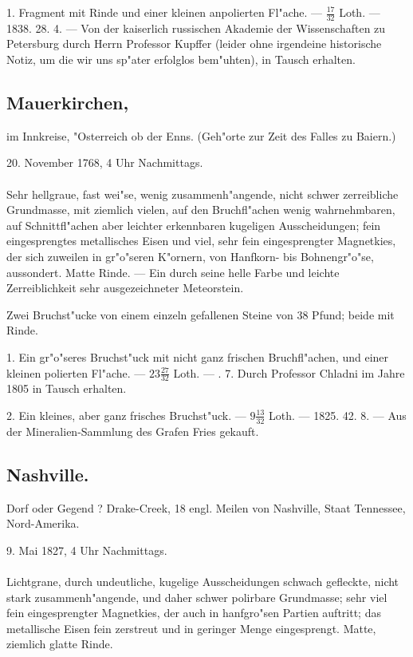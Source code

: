 \documentclass[a4paper, 11pt, oneside, polutonikogreek, german]{article}
\begin{document}
1. Fragment mit Rinde und einer kleinen anpolierten Fl"ache. --- $\frac{17}{32}$ Loth. --- 1838. 28. 4. --- Von der kaiserlich russischen Akademie der Wissenschaften zu Petersburg durch Herrn Professor Kupffer (leider ohne irgendeine historische Notiz, um die wir uns sp"ater erfolglos bem"uhten), in Tausch erhalten.
\subsection[Mauerkirchen.]{Mauerkirchen,}
\begin{center}
\small
im Innkreise, "Osterreich ob der Enns. (Geh"orte zur Zeit des Falles zu Baiern.)

20. November 1768, 4 Uhr Nachmittags.
\end{center}
\paragraph{}
Sehr hellgraue, fast wei"se, wenig zusammenh"angende, nicht schwer zerreibliche Grundmasse, mit ziemlich vielen, auf den Bruchfl"achen wenig wahrnehmbaren, auf Schnittfl"achen aber leichter erkennbaren kugeligen Ausscheidungen; fein eingesprengtes metallisches Eisen und viel, sehr fein eingesprengter Magnetkies, der sich zuweilen in gr"o"seren K"ornern, von Hanfkorn- bis Bohnengr"o"se, aussondert. Matte Rinde. --- Ein durch seine helle Farbe und leichte Zerreiblichkeit sehr ausgezeichneter Meteorstein.

Zwei Bruchst"ucke von einem einzeln gefallenen Steine von 38 Pfund; beide mit Rinde.

1. Ein gr"o"seres Bruchst"uck mit nicht ganz frischen Bruchfl"achen, und einer kleinen polierten Fl"ache. --- $23\frac{27}{32}$ Loth. --- . 7. Durch Professor Chladni im Jahre 1805 in Tausch erhalten.

2. Ein kleines, aber ganz frisches Bruchst"uck. --- $9\frac{13}{32}$ Loth. --- 1825. 42. 8. --- Aus der Mineralien-Sammlung des Grafen Fries gekauft.
\subsection{Nashville.}
\begin{center}
\small
Dorf oder Gegend ? Drake-Creek, 18 engl. Meilen von Nashville, Staat Tennessee, Nord-Amerika.

9. Mai 1827, 4 Uhr Nachmittags.
\end{center}
\paragraph{}
Lichtgrane, durch undeutliche, kugelige Ausscheidungen schwach gefleckte, nicht stark zusammenh"angende, und daher schwer polirbare Grundmasse; sehr viel fein eingesprengter Magnetkies, der auch in hanfgro"sen Partien auftritt; das metallische Eisen fein zerstreut und in geringer Menge eingesprengt. Matte, ziemlich glatte Rinde.
\end{document}
